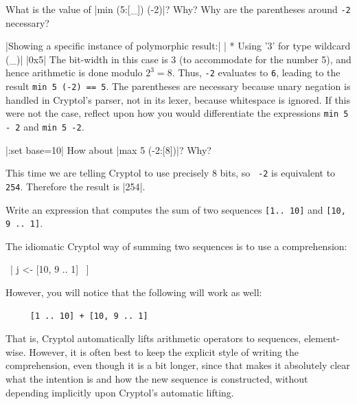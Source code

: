 \restartrepl
\begin{Exercise}\label{ex:arith:5}
  What is the value of \replin|min (5:[_]) (-2)|? Why?
  Why are the parentheses around \Verb|-2|
  necessary?\indMin\indModular\indUnaryMinus
\end{Exercise}
\begin{Answer}
  \hidereplout|Showing a specific instance of polymorphic result:|
  \hidereplout|  * Using '3' for type wildcard (_)|
  \hidereplout|0x5|
  The bit-width in this case is 3 (to accommodate for the number 5),
  and hence arithmetic is done modulo $2^3 = 8$. Thus, {\tt -2}
  evaluates to {\tt 6}, leading to the result {\tt min 5 (-2) == 5}.
  The parentheses are necessary because unary negation is handled in
  Cryptol's parser, not in its lexer, because whitespace is ignored.
  If this were not the case, reflect upon how you would differentiate
  the expressions \texttt{min 5 - 2} and \texttt{min 5 -2}.
\end{Answer}

\restartrepl
\begin{Exercise}\label{ex:arith:6}
\hidereplin|:set base=10|
How about \replin|max 5 (-2:[8])|? Why?\indMin\indModular\indUnaryMinus
\end{Exercise}
\begin{Answer}
  This time we are telling Cryptol to use precisely 8 bits, so {\tt
    -2} is equivalent to {\tt 254}. Therefore the result is \replout|254|.
\end{Answer}

\restartrepl
\begin{Exercise}\label{ex:arith:7}
  Write an expression that computes the sum of two sequences
  \texttt{[1..\ 10]} and \texttt{[10, 9 ..\ 1]}.\indPlus
\end{Exercise}
\begin{Answer}
  The idiomatic Cryptol way of summing two sequences is to use a
  comprehension:\indComp
\begin{replinVerb}
     [ i+j | i <- [1 .. 10] \
           | j <- [10, 9 .. 1] \
     ]
\end{replinVerb}
However, you will notice that the following will work as well:
\begin{Verbatim}
     [1 .. 10] + [10, 9 .. 1]
\end{Verbatim}
That is, Cryptol automatically lifts arithmetic operators to
sequences, element-wise. However, it is often best to keep the
explicit style of writing the comprehension, even though it is a bit
longer, since that makes it absolutely clear what the intention is and
how the new sequence is constructed, without depending implicitly
upon Cryptol's automatic lifting.\indArithLift
\end{Answer}

